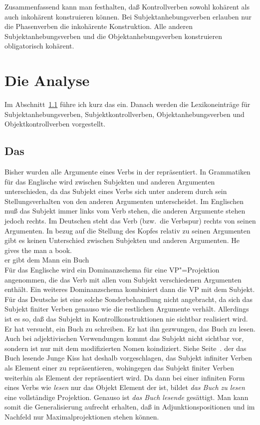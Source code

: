 \noindent
Zusammenfassend kann man festhalten, daß Kontrollverben sowohl kohärent als auch inkohärent
konstruieren können. Bei Subjektanhebungsverben erlauben nur die Phasenverben die inkohärente
Konstruktion. Alle anderen Subjektanhebungsverben und die Objektanhebungsverben konstruieren obligatorisch
kohärent.


\section{Die Analyse}
\label{sec-anhebung-anal}

Im Abschnitt~\ref{sec-subj-merkmal} führe ich kurz das \subjm ein. Danach werden die Lexikoneinträge
für Subjektanhebungsverben, Subjektkontrollverben, Objektanhebungsverben und Objektkontrollverben
vorgestellt.

\subsection{Das \subjm}
\label{sec-subj-merkmal}

Bisher wurden alle Argumente eines Verbs in der \subcatl repräsentiert.
In Grammatiken für das Englische wird zwischen Subjekten und anderen Argumenten
unterschieden, da das Subjekt eines Verbs sich unter anderem durch sein
Stellungsverhalten von den anderen Argumenten unterscheidet. Im Englischen
muß das Subjekt immer links vom Verb stehen, die anderen Argumente stehen
jedoch rechts. Im Deutschen steht das Verb (bzw.\ die Verbspur) rechts von seinen
Argumenten. In bezug auf die Stellung des Kopfes relativ zu seinen Argumenten
gibt es keinen Unterschied zwischen Subjekten und anderen Argumenten.
\ea
\gll He gives the man a book.\\
     er gibt dem Mann ein Buch\\
\z
Für das Englische wird ein Dominanzschema für eine VP"=Projektion
angenommen, die das Verb mit allen vom Subjekt verschiedenen Argumenten enthält.
Ein weiteres Dominanzschema kombiniert dann die VP mit dem Subjekt. Für das Deutsche
ist eine solche Sonderbehandlung nicht angebracht, da sich das Subjekt finiter Verben
genauso wie die restlichen Argumente verhält. Allerdings ist es so, daß das Subjekt
in Kontrollkonstruktionen nie sichtbar realisiert wird.
\eal
\ex Er hat versucht, ein Buch zu schreiben.
\ex Er hat ihn gezwungen, das Buch zu lesen.
\zl
Auch bei adjektivischen Verwendungen kommt das Subjekt nicht sichtbar
vor, sondern ist nur mit dem modifizierten Nomen koindiziert. Siehe Seite~\pageref{bsp-nominativ-adj}.
\ea
der das Buch lesende Junge
\z
Kiss \citeyearpar{Kiss92,Kiss95a} hat deshalb vorgeschlagen, das Subjekt infiniter
Verben als Element einer \subjl zu repräsentieren, wohingegen das Subjekt
finiter Verben weiterhin als Element der \subcatl repräsentiert wird. Da dann
bei einer infiniten Form eines Verbs wie \emph{lesen} nur das Objekt Element
der \subcatl ist, bildet \emph{das Buch zu lesen} eine vollständige Projektion.
Genauso ist \emph{das Buch lesende} gesättigt.
Man kann somit die Generalisierung aufrecht erhalten, daß in Adjunktionspositionen
und im Nachfeld nur Maximalprojektionen stehen können. 

